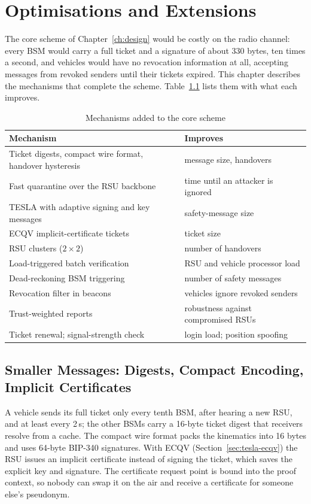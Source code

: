 \chapter{Optimisations and Extensions}\label{ch:opt}

The core scheme of Chapter~\ref{ch:design} would be costly on the radio channel: every BSM would
carry a full ticket and a signature of about 330 bytes, ten times a second, and vehicles would have
no revocation information at all, accepting messages from revoked senders until their tickets
expired. This chapter describes the mechanisms that complete the scheme. Table~\ref{tab:mechanisms}
lists them with what each improves.

\begin{table}[htbp]\centering\small
\caption{Mechanisms added to the core scheme}\label{tab:mechanisms}
\begin{tabular}{@{}ll@{}}
\toprule
Mechanism & Improves \\
\midrule
Ticket digests, compact wire format, handover hysteresis & message size, handovers \\
Fast quarantine over the RSU backbone & time until an attacker is ignored \\
TESLA with adaptive signing and key messages & safety-message size \\
ECQV implicit-certificate tickets & ticket size \\
RSU clusters ($2\times2$) & number of handovers \\
Load-triggered batch verification & RSU and vehicle processor load \\
Dead-reckoning BSM triggering & number of safety messages \\
Revocation filter in beacons & vehicles ignore revoked senders \\
Trust-weighted reports & robustness against compromised RSUs \\
Ticket renewal; signal-strength check & login load; position spoofing \\
\bottomrule
\end{tabular}
\end{table}

\section{Smaller Messages: Digests, Compact Encoding, Implicit Certificates}

A vehicle sends its full ticket only every tenth BSM, after hearing a new RSU, and at least every
2\,s; the other BSMs carry a 16-byte ticket digest that receivers resolve from a cache. The compact
wire format packs the kinematics into 16 bytes and uses 64-byte BIP-340 signatures. With ECQV
(Section~\ref{sec:tesla-ecqv}) the RSU issues an implicit certificate instead of signing the ticket, which saves the
explicit key and signature. The certificate request point is bound into the proof context, so nobody
can swap it on the air and receive a certificate for someone else's pseudonym.


